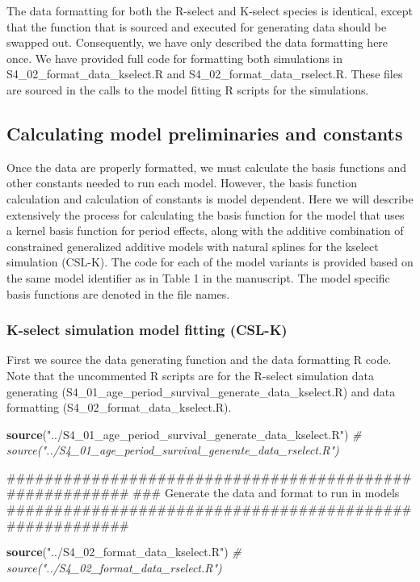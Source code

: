\documentclass[11pt,]{article}
\newenvironment{Shaded}{\begin{snugshade}}{\end{snugshade}}
\newcommand{\KeywordTok}[1]{\textcolor[rgb]{0.13,0.29,0.53}{\textbf{#1}}}
\newcommand{\StringTok}[1]{\textcolor[rgb]{0.31,0.60,0.02}{#1}}
\newcommand{\CommentTok}[1]{\textcolor[rgb]{0.56,0.35,0.01}{\textit{#1}}}
\newcommand{\NormalTok}[1]{#1}
\begin{document}
The data formatting for both the R-select and K-select species is
identical, except that the function that is sourced and executed for
generating data should be swapped out. Consequently, we have only
described the data formatting here once. We have provided full code for
formatting both simulations in S4\_02\_format\_data\_kselect.R and
S4\_02\_format\_data\_rselect.R. These files are sourced in the calls to
the model fitting R scripts for the simulations.

\subsection{Calculating model preliminaries and
constants}\label{calculating-model-preliminaries-and-constants}

Once the data are properly formatted, we must calculate the basis
functions and other constants needed to run each model. However, the
basis function calculation and calculation of constants is model
dependent. Here we will describe extensively the process for calculating
the basis function for the model that uses a kernel basis function for
period effects, along with the additive combination of constrained
generalized additive models with natural splines for the kselect
simulation (CSL-K). The code for each of the model variants is provided
based on the same model identifier as in Table 1 in the manuscript. The
model specific basis functions are denoted in the file names.

\subsubsection{K-select simulation model fitting
(CSL-K)}\label{k-select-simulation-model-fitting-csl-k}

First we source the data generating function and the data formatting R
code. Note that the uncommented R scripts are for the R-select
simulation data generating
(S4\_01\_age\_period\_survival\_generate\_data\_kselect.R) and data
formatting (S4\_02\_format\_data\_kselect.R).

\begin{Shaded}
\begin{Highlighting}[]
\KeywordTok{source}\NormalTok{(}\StringTok{"../S4_01_age_period_survival_generate_data_kselect.R"}\NormalTok{)}
\CommentTok{# source("../S4_01_age_period_survival_generate_data_rselect.R")}

\NormalTok{########################################################}
\NormalTok{### Generate the data and format to run in models}
\NormalTok{########################################################}

\KeywordTok{source}\NormalTok{(}\StringTok{"../S4_02_format_data_kselect.R"}\NormalTok{)}
\CommentTok{# source("../S4_02_format_data_rselect.R")}
\end{Highlighting}
\end{Shaded}
\end{document}
